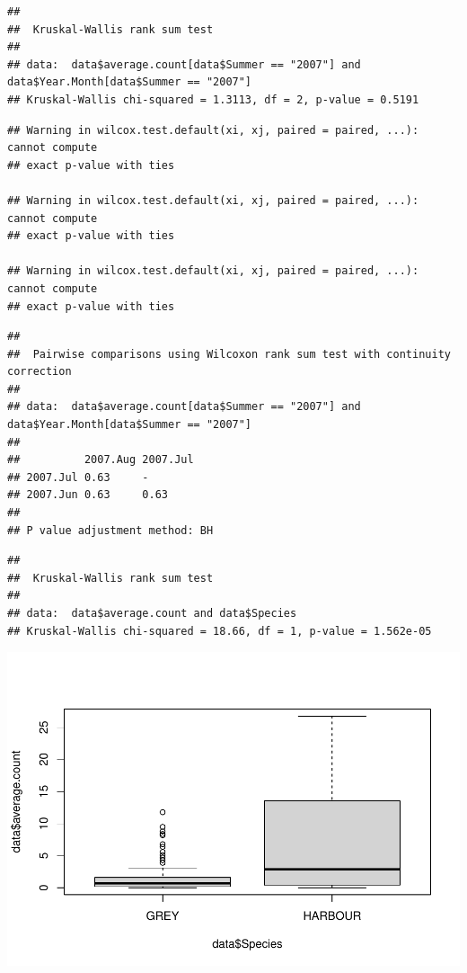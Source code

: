 \documentclass[
]{article}
\begin{document}
\begin{verbatim}
## 
##  Kruskal-Wallis rank sum test
## 
## data:  data$average.count[data$Summer == "2007"] and data$Year.Month[data$Summer == "2007"]
## Kruskal-Wallis chi-squared = 1.3113, df = 2, p-value = 0.5191
\end{verbatim}

\begin{verbatim}
## Warning in wilcox.test.default(xi, xj, paired = paired, ...): cannot compute
## exact p-value with ties

## Warning in wilcox.test.default(xi, xj, paired = paired, ...): cannot compute
## exact p-value with ties

## Warning in wilcox.test.default(xi, xj, paired = paired, ...): cannot compute
## exact p-value with ties
\end{verbatim}

\begin{verbatim}
## 
##  Pairwise comparisons using Wilcoxon rank sum test with continuity correction 
## 
## data:  data$average.count[data$Summer == "2007"] and data$Year.Month[data$Summer == "2007"] 
## 
##          2007.Aug 2007.Jul
## 2007.Jul 0.63     -       
## 2007.Jun 0.63     0.63    
## 
## P value adjustment method: BH
\end{verbatim}

\begin{verbatim}
## 
##  Kruskal-Wallis rank sum test
## 
## data:  data$average.count and data$Species
## Kruskal-Wallis chi-squared = 18.66, df = 1, p-value = 1.562e-05
\end{verbatim}

\includegraphics{Statistical-analysis-in-RStudio_files/figure-latex/unnamed-chunk-14-1.pdf}
\end{document}

